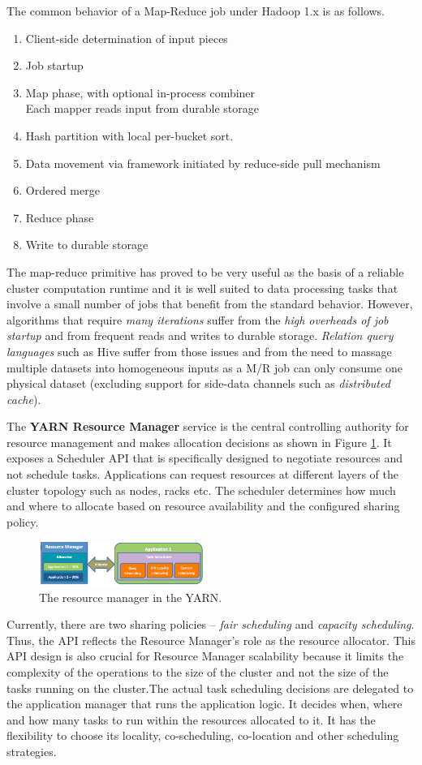\documentclass[twocolumn]{article}
\newcommand{\be}{\begin{enumerate}}
\newcommand{\ee}{\end{enumerate}}
\newcommand{\ii}{\item}
\begin{document}
The common behavior of a Map-Reduce job under Hadoop 1.x is as follows.

\be
\ii Client-side determination of input pieces
\ii Job startup
\ii Map phase, with optional in-process combiner \\
Each mapper reads input from durable storage
\ii Hash partition with local per-bucket sort.
\ii Data movement via framework initiated by reduce-side pull mechanism
\ii Ordered merge
\ii Reduce phase
\ii Write to durable storage
\ee

The map-reduce primitive has proved to be very useful as the basis of a reliable cluster computation runtime and it is well suited to data processing tasks that involve a small number of jobs that benefit from the standard behavior.  However, algorithms that require \textit{many iterations} suffer from the \textit{high overheads of job startup} and from frequent reads and writes to durable storage.  \textit{Relation query languages} such as Hive suffer from those issues and from the need to massage multiple datasets into homogeneous inputs as a M/R job can only consume one physical dataset (excluding support for side-data channels such as \textit{distributed cache}).  

The \textbf{YARN Resource Manager} service is the central controlling authority for resource management and makes allocation decisions as shown in Figure \ref{yarn}. It exposes a Scheduler API that is specifically designed to negotiate resources and not schedule tasks. Applications can request resources at different layers of the cluster topology such as nodes, racks etc. The scheduler determines how much and where to allocate based on resource availability and the configured sharing policy.
\begin{figure}[htb]
        \centering
        \includegraphics[width=0.48\textwidth]{rm}
        \caption{The resource manager in the YARN.}
        \label{yarn}
\end{figure}

Currently, there are two sharing policies – \textit{fair scheduling} and \textit{capacity scheduling}. Thus, the API reflects the Resource Manager’s role as the resource allocator. This API design is also crucial for Resource Manager scalability because it limits the complexity of the operations to the size of the cluster and not the size of the tasks running on the cluster.The actual task scheduling decisions are delegated to the application manager that runs the application logic. It decides when, where and how many tasks to run within the resources allocated to it. It has the flexibility to choose its locality, co-scheduling, co-location and other scheduling strategies.
\end{document}
